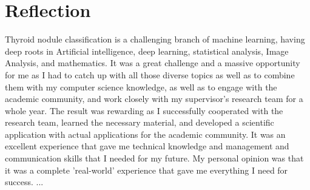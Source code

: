 \chapter{Reflection}

	Thyroid nodule classification is a challenging branch of machine learning, having deep roots in Artificial intelligence, 
	deep learning, statistical analysis, Image Analysis, and mathematics. It was a great challenge and a massive opportunity 
	for me as I had to catch up with all those diverse topics as well as to combine them with my computer science knowledge, 
	as well as to engage with the academic community, and work closely with my supervisor's research team for a whole year. 
	The result was rewarding as I successfully cooperated with the research team, learned the necessary material, and developed
	a scientific application with actual applications for the academic community. It was an excellent experience that gave me 
	technical knowledge and management and communication skills that I needed for my future. My personal opinion was that it 
	was a complete 'real-world' experience that gave me everything I need for success.
...



